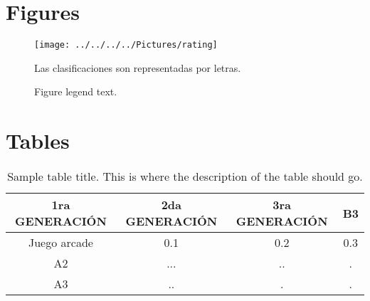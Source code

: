 \documentclass{bmcart}
\begin{document}
{\begin{backmatter}
\section*{Figures}
\begin{figure}[h!]
\texttt{[image: ../../../../Pictures/rating]}
\caption[Rating]{Las clasificaciones son representadas por letras.}
\label{fig:rating}
\end{figure}

\begin{figure}[h!]
  \caption{
      Figure legend text.}
      \end{figure}


\section*{Tables}
\begin{table}[h!]
	\caption{Sample table title. This is where the description of the table should go.}
	\begin{tabular}{cccc}
		\hline
		1ra GENERACIÓN& 2da GENERACIÓN  &3ra GENERACIÓN   & B3\\ \hline
		Juego arcade & 0.1 & 0.2 & 0.3\\
		A2 & ... & ..  & .\\
		A3 & ..  & .   & .\\ \hline
	\end{tabular}
\end{table}


\end{backmatter}}
\end{document}
